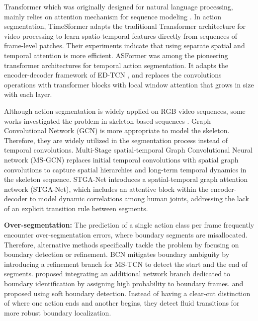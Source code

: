 Transformer which was originally designed for natural language processing, mainly relies on attention mechanism for sequence modeling \cite{vaswani2017attention}. In action segmentation, TimeSformer \cite{bertasius2021space} adapts the traditional Transformer architecture for video processing \cite{dosovitskiy2020vit, arnab2021vivit} to learn spatio-temporal features directly from sequences of frame-level patches. Their experiments indicate that using separate spatial and temporal attention is more efficient.  ASFormer \cite{yi2021asformer}  was among the pioneering transformer architectures for temporal action segmentation. It adapts the encoder-decoder framework of ED-TCN \cite{lea2017temporal}, and replaces the convolutions operations with transformer blocks with local window attention that grows in size with each layer. 

Although action segmentation is widely applied on RGB video sequences, some works investigated the problem in skeleton-based sequences \cite{filtjens2022skeleton,tian2023stga}. Graph Convolutional Network (GCN) is more appropriate to model the skeleton. Therefore, they are widely utilized in the segmentation process instead of temporal convolutions.  Multi-Stage spatial-temporal Graph Convolutional Neural network (MS-GCN) \cite{filtjens2022skeleton} replaces initial temporal convolutions with spatial graph convolutions to capture spatial hierarchies and long-term temporal dynamics in the skeleton sequence. STGA-Net \cite{tian2023stga} introduces a spatial-temporal graph attention network (STGA-Net), which includes an attentive block within the encoder-decoder to model dynamic correlations among human joints, addressing the lack of an explicit transition rule between segments. 


\textbf{Over-segmentation:} The prediction of a single action class per frame frequently encounter over-segmentation errors, where boundary segments are misallocated. Therefore, alternative methods specifically tackle the problem by focusing on boundary detection or refinement. BCN \cite{wang2020boundary} mitigates boundary ambiguity by introducing a refinement branch for MS-TCN to detect the start and the end of segments. \citet{ishikawa2021alleviating} proposed integrating an additional network branch dedicated to boundary identification by assigning high probability to boundary frames. \citet{ding2022leveraging} and \citet{ding2018weakly} proposed using soft boundary detection. Instead of having a clear-cut distinction of where one action ends and another begins, they detect fluid transitions for more robust boundary localization.

